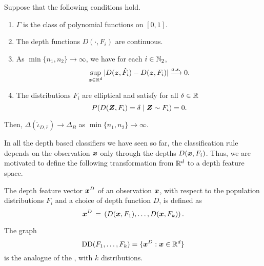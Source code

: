 \begin{lemma}
    Suppose that the following conditions hold.
    \vspace{-1em}
    \begin{enumerate}[itemsep = -0.2em]
        \item $\Gamma$ is the class of polynomial functions on $[0, 1]$.
        \item The depth functions $D(\cdot, F_i)$ are continuous.
        \item As $\min\{n_1, n_2\} \to \infty$, we have for each $i \in \mathbb{N}_2$,
        \begin{equation}
            \sup_{\bm{z} \in \mathbb{R}^d} |D(\bm{z}, \hat{F}_i) - D(\bm{z}, F_i)| \overset{a.s.\,}{\longrightarrow} 0.
        \end{equation}
        \item The distributions $F_i$ are elliptical and satisfy for all
        $\delta \in \mathbb{R}$
        \begin{equation}
            P(D(\bm{Z}, F_i) = \delta \mid \bm{Z} \sim F_i) = 0.
        \end{equation}
    \end{enumerate}
    Then, $\Delta(\hat{\iota}_{D, \hat{r}}) \to \Delta_B$ as $\min\{n_1, n_2\}
    \to \infty$.
\end{lemma}

In all the depth based classifiers we have seen so far, the classification
rule depends on the observation $\bm{x}$ only through the depths $D(\bm{x}, F_i)$.
Thus, we are motivated to define the following transformation from $\mathbb{R}^d$ to a
depth feature space.

\begin{definition}
    The depth feature vector $\bm{x}^D$ of an observation $\bm{x}$, with respect to
    the population distributions $F_i$ and a choice of depth function $D$, is
    defined as
    \begin{equation}
        \bm{x}^D \,=\, \left(D(\bm{x}, F_1), \dots, D(\bm{x}, F_k)\right).
    \end{equation}
\end{definition}
\begin{remark}
    The graph
    \begin{equation}
        \operatorname{DD}(F_1, \dots, F_k) = \{\bm{x}^D : \bm{x} \in \mathbb{R}^d\}
    \end{equation}
    is the analogue of the , with $k$ distributions.
\end{remark}

